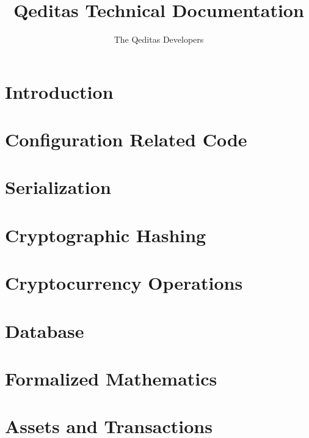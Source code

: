 \documentclass{book}
\title{Qeditas Technical Documentation}
\author{The Qeditas Developers}
\begin{document}
\maketitle

\tableofcontents

\chapter{Introduction}



\chapter{Configuration Related Code}\label{chap:config}



\chapter{Serialization}\label{chap:ser}



\chapter{Cryptographic Hashing}\label{chap:hash}



\chapter{Cryptocurrency Operations}\label{chap:cryptocurr}



\chapter{Database}\label{chap:db}



\chapter{Formalized Mathematics}\label{chap:math}



\chapter{Assets and Transactions}\label{chap:assetstx}
\end{document}
